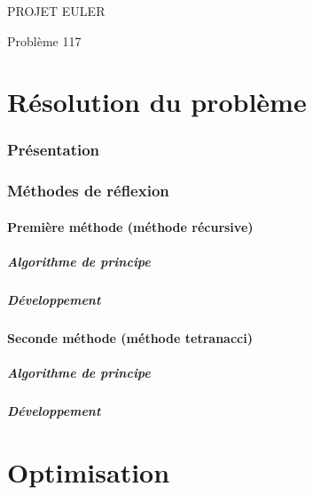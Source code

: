 \documentclass{article}
\begin{document}
\hfill
\hfill
\hfill
\begin{center}
  \large{PROJET EULER}

  Problème 117
\end{center}
\tableofcontents
\newpage
\part {Résolution du problème}
\section {Présentation}



\section{Méthodes de réflexion}

\subsection{Première méthode (méthode récursive)}

\subsubsection{Algorithme de principe}


\subsubsection{Développement}


\subsection{Seconde méthode (méthode tetranacci)}

\subsubsection{Algorithme de principe}


\subsubsection{Développement}



\newpage
\part {Optimisation}
\end{document}
